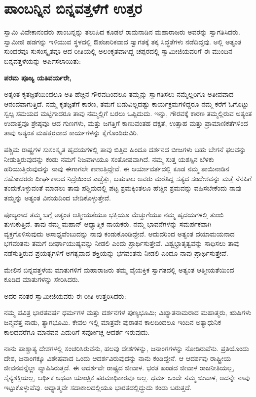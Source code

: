 
\chapter{ಪಾಂಬನ್ನಿನ ಬಿನ್ನವತ್ತಳೆಗೆ ಉತ್ತರ}

ಸ್ವಾಮಿ ವಿವೇಕಾನಂದರು ಪಾಂಬನ್ನನ್ನು ತಲುಪಿದ ಕೂಡಲೆ ರಾಮನಾಡಿನ ಮಹಾರಾಜರು ಅವರನ್ನು ಸ್ವಾಗತಿಸಿದರು. ಸ್ವಾಮೀಜಿ ಹಡಗನ್ನು ಇಳಿಯುವ ಸ್ಥಳದಲ್ಲಿ ಔಪಚಾರಿಕವಾದ ಸ್ವಾಗತಕ್ಕೆ ತಕ್ಕ ಸಿದ್ಧತೆಗಳು ನಡೆದಿದ್ದವು. ಅಲ್ಲಿ ಅತ್ಯಂತ ಸುಂದರವೂ ಸುಸಂಸ್ಕೃತವೂ ಆದ ರೀತಿಯಲ್ಲಿ ಅಲಂಕೃತವಾಗಿದ್ದ ಚಪ್ಪರದಲ್ಲಿ ಸ್ವಾಮೀಜಿಯವರಿಗೆ ಈ ಮುಂದಿನ ಬಿನ್ನವತ್ತಳೆಯನ್ನು ಅರ್ಪಿಸಲಾಯಿತು:

\textbf{ಪರಮ ಪೂಜ್ಯ ಯತಿವರ್ಯರೇ,}

ಅತ್ಯಂತ ಕೃತಜ್ಞತೆಯಿಂದಲೂ ಅತಿ ಹೆಚ್ಚಿನ ಗೌರವದಿಂದಲೂ ತಮ್ಮನ್ನು ಸ್ವಾಗತಿಸಲು ನಮ್ಮೆಲ್ಲರಿಗೂ ಅತೀವವಾದ ಆನಂದವಾಗುತ್ತಿದೆ. ನಮ್ಮ ಕೃತಜ್ಞತೆಗೆ ಕಾರಣ, ತಮಗೆ ಬಿಡುವಿಲ್ಲದಷ್ಟು ಕಾರ್ಯಕ್ರಮಗಳಿದ್ದರೂ ನಮ್ಮ ಕರೆಗೆ ಓಗೊಟ್ಟು ಸ್ವಲ್ಪ ಸಮಯದ ಮಟ್ಟಿಗಾದರೂ ತಾವು ನಮ್ಮಲ್ಲಿಗೆ ಬರಲು ಒಪ್ಪಿದುದು. ಇನ್ನು, ಗೌರವಕ್ಕೆ ಕಾರಣ ತಮ್ಮಲ್ಲಿರುವ ಅತ್ಯಂತ ಉದಾತ್ತವೂ ಶ್ರೇಷ್ಠವೂ ಆದ ಗುಣಗಳು, ಮತ್ತು ಜಗತ್ತಿಗೆ ಕಾಣುವಂತಹ ದಕ್ಷತೆ, ಉತ್ಸಾಹ ಮತ್ತು ಪ್ರಾಮಾಣಿಕತೆಗಳಿಂದ ತಾವು ಅತ್ಯಂತ ಮಹತ್ತರವಾದ ಕಾರ್ಯಗಳನ್ನು ಕೈಗೊಂಡಿರುವಿರಿ.

ಪಶ್ಚಿಮ ರಾಷ್ಟ್ರಗಳ ಸುಸಂಸ್ಕೃತ ಹೃದಯಗಳಲ್ಲಿ ತಾವು ಬಿತ್ತಿದ ಹಿಂದೂ ದರ್ಶನದ ಬೀಜಗಳು ಬಹು ಬೇಗನೆ ಫಲವನ್ನು ನೀಡುತ್ತಿರುವುದನ್ನು ಕಂಡು ನಮಗೆ ನಿಜವಾಗಿಯೂ ಸಂತೋಷವಾಗಿದೆ. ನಮ್ಮ ಸುತ್ತ ಯಶಸ್ಸಿನ ಬೆಳಕು ಹರಿಯುತ್ತಿರುವುದನ್ನು ನಾವು ಈಗಾಗಲೇ ಕಾಣುತ್ತಿದ್ದೇವೆ. ಈ ಆರ್ಯಾವರ್ತದಲ್ಲಿ ಕೂಡ ನಮ್ಮ ತಾಯಿನಾಡಿನ ಸಹೋದರರು ದೀರ್ಘಕಾಲದ ನಿದ್ರೆಯಿಂದ ಎಚ್ಚೆತ್ತು, ಬಹುಕಾಲ ಅವರು ಮರೆತಿದ್ದ ಸತ್ಯದ ಸಂದೇಶವನ್ನು ಮತ್ತೆ ನೆನಪಿಗೆ ತಂದುಕೊಳ್ಳುವಂತೆ ಮಾಡಲು ತಾವು ಪಶ್ಚಿಮದಲ್ಲಿ ಪಟ್ಟ ಶ್ರಮಕ್ಕಿಂತಲೂ ಹೆಚ್ಚಿನ ಶ್ರಮವನ್ನು ವಹಿಸಬೇಕೆಂದು ನಾವು ತಮ್ಮನ್ನು ಅತ್ಯಂತ ವಿನಯದಿಂದ ಬೇಡಿಕೊಳ್ಳುತ್ತೇವೆ.

ಪೂಜ್ಯರಾದ ತಮ್ಮ ಬಗ್ಗೆ ಅತ್ಯಂತ ಆತ್ಮೀಯತೆಯೂ ಭಕ್ತಿಯೂ ಮೆಚ್ಚುಗೆಯೂ ನಮ್ಮ ಹೃದಯಗಳಲ್ಲಿ ತುಂಬಿ ತುಳುಕುತ್ತಿದೆ. ತಾವು ನಮ್ಮ ಮಹಾನ್​ ಆಧ್ಯಾತ್ಮಿಕ ನಾಯಕರು. ನಮ್ಮ ಭಾವನೆಗಳನ್ನು ಸಮರ್ಪಕವಾಗಿ ವ್ಯಕ್ತಗೊಳಿಸುವುದು ಅಸಾಧ್ಯವೆಂಬುದನ್ನು ನಾವು ಕಂಡುಕೊಂಡಿದ್ದೇವೆ. ಆದುದರಿಂದ ಅತ್ಯಂತ ದಯಾಮಯನಾದ ಭಗವಂತನು ತಮಗೆ ದೀರ್ಘಾಯುಷ್ಯವನ್ನು ನೀಡಲಿ ಎಂದು ಪ್ರಾರ್ಥಿಸುತ್ತೇವೆ. ವಿಶ್ವಭ್ರಾತೃತ್ವವನ್ನು ಸಾಧಿಸಲು ತಾವು ನಡೆಸುತ್ತಿರುವ ಪ್ರಯತ್ನಗಳಿಗೆ ಅಗತ್ಯವಾದ ಶಕ್ತಿಯನ್ನು ಭಗವಂತನು ನೀಡಲಿ ಎಂದೂ ನಾವು ಪ್ರಾರ್ಥಿಸುತ್ತೇವೆ.

ಮೇಲಿನ ಬಿನ್ನವತ್ತಳೆಯ ಮಾತುಗಳಿಗೆ ಮಹಾರಾಜರು ತಮ್ಮ ವೈಯಕ್ತಿಕ ಸ್ವಾಗತದಲ್ಲಿ ಅತ್ಯಂತ ಆತ್ಮೀಯತೆಯಿಂದ ಕೂಡಿದ ಮಾತುಗಳನ್ನು ಸೇರಿಸಿದರು.

ಅದರ ನಂತರ ಸ್ವಾಮೀಜಿಯವರು ಈ ರೀತಿ ಉತ್ತರಿಸಿದರು:

ನಮ್ಮ ಪವಿತ್ರ ಭಾರತವರ್ಷ ಧರ್ಮಗಳ ಮತ್ತು ದರ್ಶನಗಳ ಪುಣ್ಯಭೂಮಿ; ವಿಖ್ಯಾತನಾಮರಾದ ಮಹಾತ್ಮರು, ಋಷಿಗಳು ಜನ್ಮವೆತ್ತ ನಾಡು, ತ್ಯಾಗಭೂಮಿ. ಕೇವಲ ಇಲ್ಲಿ ಮಾತ್ರವೇ ಪುರಾತನ ಕಾಲದಿಂದಲೂ ಇಂದಿನ ಅತ್ಯಾಧುನಿಕ ಕಾಲದವರೆಗೂ ಮಾನವನ ಎದುರಿಗೆ ಸರ್ವೋಚ್ಚ ಆದರ್ಶ ಇರುವುದು.

ನಾನು ಪಾಶ್ಚಾತ್ಯ ದೇಶಗಳಲ್ಲಿ ಸಂಚರಿಸಿರುವೆನು, ಹಲವು ದೇಶಗಳನ್ನು, ಜನಾಂಗಗಳನ್ನು ನೋಡಿರುವೆನು. ಪ್ರತಿಯೊಂದು ದೇಶ, ಜನಾಂಗಕ್ಕೂ ವಿಶೇಷವಾದ ಒಂದು ಆದರ್ಶವಿರುವುದನ್ನು ನಾನು ಕಂಡಿದ್ದೇನೆ. ಆ ಆದರ್ಶವು ರಾಷ್ಟ್ರೀಯ ಜೀವನವನ್ನೆಲ್ಲಾ ವ್ಯಾಪಿಸಿರುತ್ತದೆ. ಈ ಆದರ್ಶವೇ ರಾಷ್ಟ್ರದ ಜೀವಾಳ. ಭರತ ಖಂಡದ ಜೀವಾಳ ರಾಜನೀತಿಯಲ್ಲ, ಸೈನ್ಯಶಕ್ತಿಯಲ್ಲ, ಆರ್ಥಿಕ ಅಥವಾ ಯಾಂತ್ರಿಕ ಪರಮಾಧಿಕಾರವೂ ಅಲ್ಲ. ಧರ್ಮ ಒಂದೇ ನಮ್ಮ ಜೀವಾಳ, ಅದನ್ನೇ ನಾವು ಇಟ್ಟುಕೊಳ್ಳುವೆವು. ಅಧ್ಯಾತ್ಮವೇ ಸದಾಕಾಲದಲ್ಲಿಯೂ ಭಾರತದಲ್ಲಿದ್ದುದು ಕಂಡು ಬರುತ್ತದೆ.

